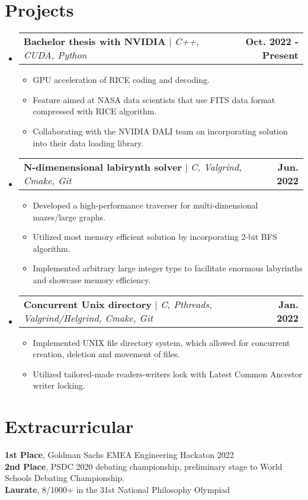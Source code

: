 \documentclass[letterpaper,11pt]{article}
\makeatletter
\newcommand{\resumeItem}[1]{
  \item\small{
    {#1 \vspace{-2pt}}
  }
}
\newcommand{\resumeProjectHeading}[2]{
    \item
    \begin{tabular*}{1.001\textwidth}{l@{\extracolsep{\fill}}r}
      \small#1 & \textbf{\small #2}\\
    \end{tabular*}\vspace{-7pt}
}
\newcommand{\resumeSubHeadingListStart}{\begin{itemize}[leftmargin=0.0in, label={}]}
\newcommand{\resumeSubHeadingListEnd}{\end{itemize}}
\newcommand{\resumeItemListStart}{\begin{itemize}}
\newcommand{\resumeItemListEnd}{\end{itemize}\vspace{-5pt}}
\makeatother
\begin{document}
\section{Projects}
    \vspace{-5pt}
    \resumeSubHeadingListStart
\resumeProjectHeading
{\textbf{Bachelor thesis with NVIDIA} $|$ \emph{C++, CUDA, Python}}{Oct. 2022 - Present}
\resumeItemListStart
\resumeItem{GPU acceleration of RICE coding and decoding.}
\resumeItem{Feature aimed at NASA data scientists that use FITS data format compressed with RICE algorithm.}
\resumeItem{Collaborating with the NVIDIA DALI team on incorporating solution into their data loading library. }
\resumeItemListEnd
\vspace{-13pt}
\resumeProjectHeading
    {\textbf{N-dimenensional labirynth solver} $|$ \emph{C, Valgrind, Cmake,  Git}}{Jun. 2022}
        \resumeItemListStart
          \resumeItem{Developed a high-performance traverser for multi-dimensional mazes/large graphs.}
          \resumeItem{Utilized most memory efficient solution by incorporating 2-bit BFS algorithm.}
          \resumeItem{Implemented arbitrary large integer type to facilitate enormous labyrinths and showcase memory efficiency.}
        \resumeItemListEnd
        \vspace{-13pt}
      \resumeProjectHeading
          {\textbf{Concurrent Unix directory} $|$ \emph{C, Pthreads, Valgrind/Helgrind, Cmake,  Git}}{Jan. 2022}
          \resumeItemListStart
            \resumeItem{Implemented UNIX file directory system, which allowed for concurrent creation, deletion and movement of files. }
            \resumeItem{Utilized tailored-made readers-writers lock with Latest Common Ancestor writer locking.}
\resumeItemListEnd
    \resumeSubHeadingListEnd
\vspace{-16pt}


\section{Extracurricular}
 \begin{itemize}[leftmargin=0.15in, label={}]
    \small{\item{
\textbf{1st Place}{, Goldman Sachs EMEA Engineering Hackaton 2022} \\
\textbf{2nd Place}{, PSDC 2020 debating championship, preliminary stage to World Schools Debating Championship.} \\
     \textbf{Laurate}{, 8/1000+ in the 31st National Philosophy Olympiad} \\
    }}
 \end{itemize}
 \vspace{-16pt}
 
\end{document}
